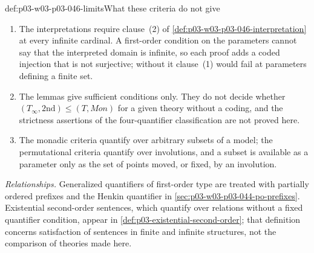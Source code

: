 \begin{hbwarning}{def:p03-w03-p03-046-limits}{What these criteria do not give}
\begin{enumerate}
  \item The interpretations require clause~(2) of
        \cref{def:p03-w03-p03-046-interpretation} at every infinite
        cardinal. A first-order condition on the parameters cannot say that
        the interpreted domain is infinite, so each proof adds a coded
        injection that is not surjective; without it clause~(1) would fail
        at parameters defining a finite set.
  \item The lemmas give sufficient conditions only. They do not
        decide whether \((T_\infty,\mathrm{2nd})\le(T,\mathit{Mon})\) for a given
        theory without a coding, and the strictness assertions of the
        four-quantifier classification are not proved here.
  \item The monadic criteria quantify over arbitrary subsets of a model; the
        permutational criteria quantify over involutions, and a subset is
        available as a parameter only as the set of points moved, or fixed,
        by an involution.
\end{enumerate}
\end{hbwarning}

\emph{Relationships.} Generalized quantifiers of first-order type are
treated with partially ordered prefixes and the Henkin quantifier in
\cref{sec:p03-w03-p03-044-po-prefixes}. Existential second-order
sentences, which quantify over relations without a fixed quantifier
condition, appear in \cref{def:p03-existential-second-order}; that
definition concerns satisfaction of sentences in finite and infinite
structures, not the comparison of theories made here.
